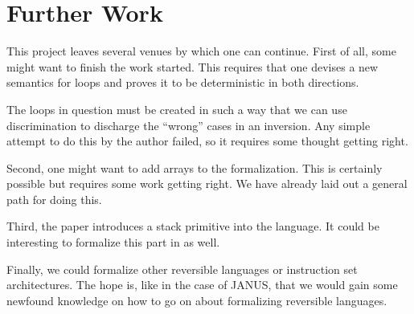 \chapter{Further Work}

This project leaves several venues by which one can continue. First of
all, some might want to finish the work started. This requires that
one devises a new semantics for loops and proves it to be
deterministic in both directions.

The loops in question must be created in such a way that we can use
discrimination to discharge the ``wrong'' cases in an inversion. Any
simple attempt to do this by the author failed, so it requires some
thought getting right.

Second, one might want to add arrays to the formalization. This is
certainly possible but requires some work getting right. We have
already laid out a general path for doing this.

Third, the paper \cite{glueck+2008} introduces a stack primitive into
the language. It could be interesting to formalize this part in \coq{}
as well.

Finally, we could formalize other reversible languages or instruction
set architectures. The hope is, like in the case of JANUS, that we
would gain some newfound knowledge on how to go on about formalizing
reversible languages.

